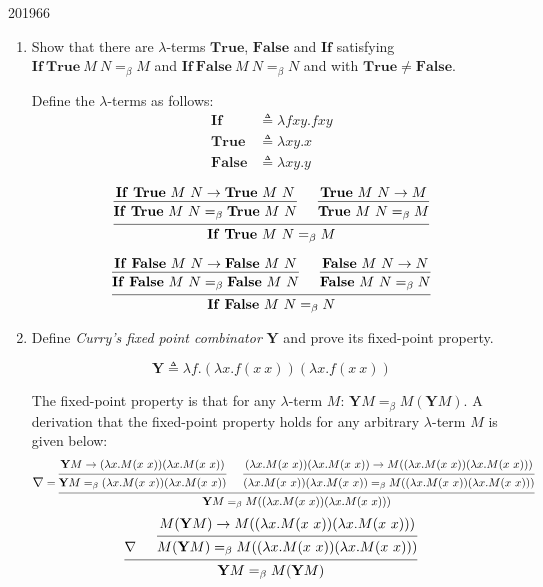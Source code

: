 \documentclass[10pt,\jkfside,a4paper]{article}
\begin{document}
\begin{examquestion}{2019}{6}{6}
\begin{enumerate}
\begin{enumerate}
\end{enumerate}

\item Show that there are $\lambda$-terms $\mathbf{True}$, $\mathbf{False}$
and $\mathbf{If}$ satisfying $\mathbf{If}\ \mathbf{True}\ M\ N =_\beta M$
and $\mathbf{If}\ \mathbf{False}\ M\ N =_\beta N$ and with $\mathbf{True}
\neq \mathbf{False}$.

Define the $\lambda$-terms as follows:
\begin{align*}
\mathbf{If} &\triangleq \lambda fxy. fxy \\
\mathbf{True} &\triangleq \lambda xy. x \\
\mathbf{False} &\triangleq \lambda xy. y
\end{align*}

\[
\begin{prooftree}
\hypo{\mathbf{If}\ \mathbf{True}\ M\ N \to \mathbf{True}\ M\ N}
\infer1{
\mathbf{If}\ \mathbf{True}\ M\ N =_\beta \mathbf{True}\ M\ N
}
\hypo{\mathbf{True}\ M\ N \to M}
\infer1{
\mathbf{True}\ M\ N =_\beta M
}
\infer2{
\mathbf{If}\ \mathbf{True}\ M\ N =_\beta M
}
\end{prooftree}
\]

\[
\begin{prooftree}
\hypo{\mathbf{If}\ \mathbf{False}\ M\ N \to \mathbf{False}\ M\ N}
\infer1{
\mathbf{If}\ \mathbf{False}\ M\ N =_\beta \mathbf{False}\ M\ N
}
\hypo{\mathbf{False}\ M\ N \to N}
\infer1{
\mathbf{False}\ M\ N =_\beta N
}
\infer2{
\mathbf{If}\ \mathbf{False}\ M\ N =_\beta N
}
\end{prooftree}
\]

\item Define \textit{Curry's fixed point combinator} $\mathbf{Y}$ and prove
its fixed-point property.

\[
\mathbf{Y} \triangleq \lambda f. (\lambda x. f (x\ x))(\lambda x. f (x\ x))
\]

The fixed-point property is that for any $\lambda$-term $M$: $\mathbf{Y}M
=_\beta M(\mathbf{Y}M)$. A derivation that the fixed-point property holds for
any arbitrary $\lambda$-term $M$ is given below:
\[
\mathlarger{\nabla} =
\begin{prooftree}
\hypo{\mathbf{Y}M \to (\lambda x. M(x\ x))(\lambda x. M(x\ x))}
\infer1{
\mathbf{Y}M =_\beta (\lambda x. M(x\ x))(\lambda x. M(x\ x))
}
\hypo{(\lambda x. M(x\ x))(\lambda x. M(x\ x)) \to M((\lambda x. M(x\ x))(\lambda x. M(x\ x)))}
\infer1{
(\lambda x. M(x\ x))(\lambda x. M(x\ x)) =_\beta M((\lambda x. M(x\ x))(\lambda x. M(x\ x)))
}
\infer2{
\mathbf{Y}M =_\beta M((\lambda x. M(x\ x))(\lambda x. M(x\ x)))
}
\end{prooftree}
\]
\[
\begin{prooftree}
\hypo{\mathlarger{\nabla}}
\hypo{M(\mathbf{Y}M) \to M((\lambda x. M(x\ x))(\lambda x. M(x\ x)))}
\infer1{
M(\mathbf{Y}M) =_\beta M((\lambda x. M(x\ x))(\lambda x. M(x\ x)))
}
\infer2{
\mathbf{Y}M =_\beta M(\mathbf{Y}M)
}
\end{prooftree}
\]


\end{enumerate}
\end{examquestion}
\end{document}
